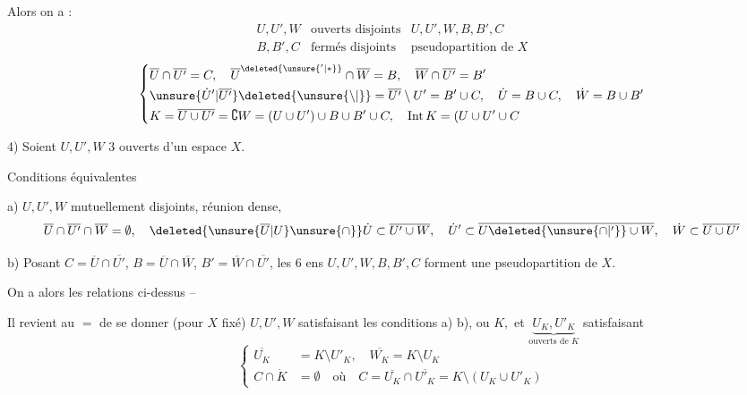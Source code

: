 Alors on a :
\[
\begin{array}{ll|l}
 U,U',W&\text{ouverts disjoints}& U,U',W,B,B',C\\
 B,B',C&\text{fermés disjoints}&\text{pseudopartition de }X
\end{array}
\]
\[
\left\{\begin{aligned}
 &\overline U\cap\overline{U'}=C,\quad
 \overline U^{\deleted{\unsure{'|*}}}\cap\overline W=B,\quad
 \overline W\cap\overline{U'}=B'\\
 &\unsure{\dot U'|\overline{U'}}\deleted{\unsure{\setminus|{}}}=\overline{U'}\setminus U'=B'\cup C,\quad
 \dot U=B\cup C,\quad \dot W=B\cup B'\\
 &K=\overline{U\cup U'}=\complement W=(U\cup U')\cup B\cup B'\cup C,\quad
 \mathrm{Int}\,K=(U\cup U'\cup C
\end{aligned}\right.
\]

4)  Soient $U,U',W$ 3 ouverts d'un espace $X$.

Conditions équivalentes

a) $U,U',W$ mutuellement disjoints, réunion dense,
\[
 \overline U\cap\overline{U'}\cap\overline W=\emptyset,\quad
 \deleted{\unsure{\overline U|U}\unsure{\cap}}\dot U\subset\overline{U'\cup W},\quad
 \dot U'\subset\overline{U\deleted{\unsure{\cap|'}}\cup W},\quad
 \dot W\subset\overline{U\cup U'}
\]

b) Posant $C=\overline U\cap\overline{U'}$, $B=\overline U\cap\overline W$, $B'=\overline W\cap\overline{U'}$, les 6 ens $U,U',W,B,B',C$ forment une pseudopartition de $X$.

On a alors les relations ci-dessus --

Il revient au $=$ de se donner (pour $X$ fixé) $U,U',W$ satisfaisant les conditions  a) b), ou $K,$  et $\underbrace{U_K,U'_K}_{\text{ouverts de }K}$ satisfaisant
\[
\left\{\begin{aligned}
 \overline{U_K}&=K\setminus U'_K,\quad \overline{W_K}=K\setminus U_K\\
 C\cap\dot K&=\emptyset\quad \text{où}\quad C=\overline{U_K}\cap\overline{U'_K}=K\setminus(U_K\cup U'_K)
\end{aligned}\right.
\]


